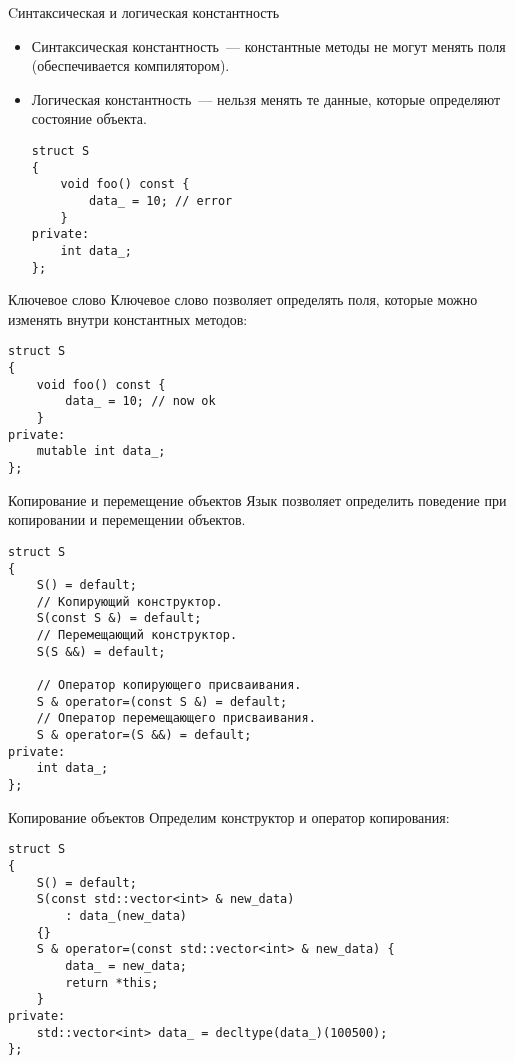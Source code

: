 \documentclass{beamer}
\begin{document}
\begin{frame}[fragile]{Cинтаксическая и логическая константность}{}
    \begin{itemize}
    \item Синтаксическая константность~--- константные методы
        не могут менять поля (обеспечивается компилятором).
    \item Логическая константность~--- нельзя менять те данные, 
        которые определяют состояние объекта.
        \begin{lstlisting}
struct S 
{
    void foo() const {
        data_ = 10; // error
    }
private:
    int data_;
};
        \end{lstlisting}
    \end{itemize}
\end{frame}

\begin{frame}[fragile]{Ключевое слово }{}
    Ключевое слово  позволяет определять поля,
    которые можно изменять внутри константных методов:
    \begin{lstlisting}
struct S 
{
    void foo() const {
        data_ = 10; // now ok
    }
private:
    mutable int data_;
};
    \end{lstlisting}
\end{frame}

\begin{frame}[fragile]{Копирование и перемещение объектов}{}
    Язык \langcpp позволяет определить поведение при копировании и перемещении объектов.
    \begin{lstlisting}
struct S 
{
    S() = default;
    // Копирующий конструктор.
    S(const S &) = default;
    // Перемещающий конструктор.
    S(S &&) = default;

    // Оператор копирующего присваивания.
    S & operator=(const S &) = default;
    // Оператор перемещающего присваивания.
    S & operator=(S &&) = default;
private:
    int data_;
};
    \end{lstlisting}
\end{frame}

\begin{frame}[fragile]{Копирование объектов}{}
    Определим конструктор и оператор копирования:
    \begin{lstlisting}
struct S 
{
    S() = default;
    S(const std::vector<int> & new_data)
        : data_(new_data)
    {}
    S & operator=(const std::vector<int> & new_data) {
        data_ = new_data;
        return *this;
    }
private:
    std::vector<int> data_ = decltype(data_)(100500);
};
    \end{lstlisting}
\end{frame}
\end{document}
